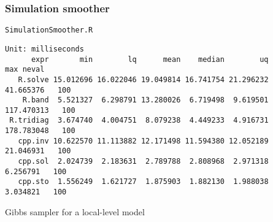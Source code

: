 \documentclass[notes,blackandwhite,mathsans]{beamer}
\begin{document}
{\begin{frame}[fragile]
\frametitle{Simulation smoother}
\texttt{SimulationSmoother.R}\\ 


\bigskip
\begin{adjustwidth}{-0.4cm}{0cm}
\scriptsize
\begin{verbatim}
Unit: milliseconds
      expr       min        lq      mean    median        uq        max neval
   R.solve 15.012696 16.022046 19.049814 16.741754 21.296232  41.665376   100
    R.band  5.521327  6.298791 13.280026  6.719498  9.619501 117.470313   100
 R.tridiag  3.674740  4.004751  8.079238  4.449233  4.916731 178.783048   100
   cpp.inv 10.622570 11.113882 12.171498 11.594380 12.052189  21.046931   100
   cpp.sol  2.024739  2.183631  2.789788  2.808968  2.971318   6.256791   100
   cpp.sto  1.556249  1.621727  1.875903  1.882130  1.988038   3.034821   100
\end{verbatim}
\end{adjustwidth}
\end{frame}






}











{
\begin{frame}

\begin{adjustwidth}{-0.5cm}{0cm}
\FlushLeft
\vspace{8.0cm}\LARGE
{{\color{black}Gibbs sampler} {\color{lightgray}for a local-level model}}
\end{adjustwidth}

\end{frame}
}
\end{document}
